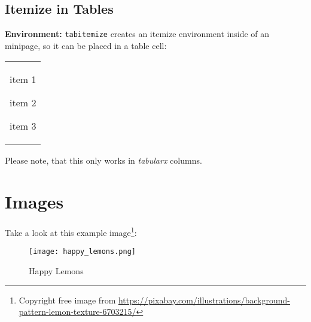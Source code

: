 \documentclass[10pt]{article}
\newcommand{\environmentcmd}[1]{\par\noindent\textbf{Environment:} \lstinline^#1^}
\begin{document}
\subsection{Itemize in Tables}
\environmentcmd{tabitemize} creates an itemize environment inside of an minipage, so it can be placed in a table cell:

\begin{table}[!h]
  \centering
  \begin{tabularx}{0.5\linewidth}{Y}
    \toprule
        \\
    \midrule
    \begin{tabitemize}
      \item item 1
      \item item 2
      \item item 3
    \end{tabitemize} \\
    \bottomrule
  \end{tabularx}
\end{table}

Please note, that this only works in \emph{tabularx} columns.

\section{Images}
Take a look at this example image\footnote{Copyright free image from \url{https://pixabay.com/illustrations/background-pattern-lemon-texture-6703215/}}:
\begin{figure}[h!t]
  \centering
  \texttt{[image: happy\_lemons.png]}
  \caption{\label{fig:happylemons}Happy Lemons}
\end{figure}
\end{document}
